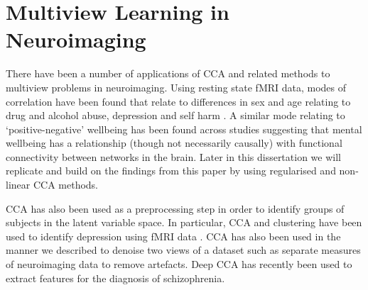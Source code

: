 \section{Multiview Learning in Neuroimaging}

There have been a number of applications of CCA and related methods to multiview problems in neuroimaging.
Using resting state fMRI data, modes of correlation have been found that relate to differences in sex and age relating to drug and alcohol abuse, depression and self harm \cite{mihalik2019brain}.
A similar mode relating to `positive-negative' wellbeing has been found across studies \cite{smith2015positive}suggesting that mental wellbeing has a relationship (though not necessarily causally) with functional connectivity between networks in the brain.
Later in this dissertation we will replicate and build on the findings from this paper by using regularised and non-linear CCA methods.

CCA has also been used as a preprocessing step in order to identify groups of subjects in the latent variable space.
In particular, CCA and clustering have been used to identify depression using fMRI data\cite{dinga2019evaluating} \cite{drysdale2017resting}.
CCA has also been used in the manner we described to denoise two views of a dataset such as separate measures of neuroimaging data \cite{zhuang2020technical} to remove artefacts.
Deep CCA has recently been used to extract features for the diagnosis of schizophrenia\cite{qi2016deep}.





